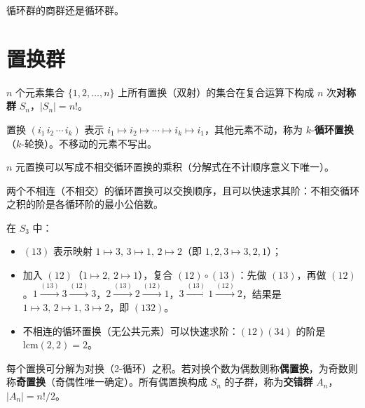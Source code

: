 \begin{proposition}[循环群的商群]
循环群的商群还是循环群。
\end{proposition}

\section{置换群}

\begin{definition}[对称群]
$n$ 个元素集合 $\{1, 2, \ldots, n\}$ 上所有置换（双射）的集合在复合运算下构成 $n$ 次\textbf{对称群} $S_n$，$|S_n| = n!$。
\end{definition}

\begin{definition}[循环置换]
置换 $(i_1\, i_2\, \cdots\, i_k)$ 表示 $i_1 \mapsto i_2 \mapsto \cdots \mapsto i_k \mapsto i_1$，其他元素不动，称为 $k$-\textbf{循环置换}（$k$-轮换）。不移动的元素不写出。
\end{definition}

\begin{theorem}[定理 2：置换分解为循环置换]
$n$ 元置换可以写成不相交循环置换的乘积（分解式在不计顺序意义下唯一）。
\end{theorem}

\begin{note}
两个不相连（不相交）的循环置换可以交换顺序，且可以快速求其阶：不相交循环之积的阶是各循环阶的最小公倍数。
\end{note}

\begin{example}[循环置换的例子]
在 $S_3$ 中：
\begin{itemize}
  \item $(13)$ 表示映射 $1 \mapsto 3,\, 3 \mapsto 1,\, 2 \mapsto 2$（即 $1,2,3 \mapsto 3,2,1$）；
  \item 加入 $(12)$（$1 \mapsto 2,\, 2 \mapsto 1$），复合 $(12) \circ (13)$：先做 $(13)$，再做 $(12)$。$1 \xrightarrow{(13)} 3 \xrightarrow{(12)} 3$，$2 \xrightarrow{(13)} 2 \xrightarrow{(12)} 1$，$3 \xrightarrow{(13)} 1 \xrightarrow{(12)} 2$，结果是 $1 \mapsto 3,\, 2 \mapsto 1,\, 3 \mapsto 2$，即 $(132)$。
  \item 不相连的循环置换（无公共元素）可以快速求阶：$(12)(34)$ 的阶是 $\mathrm{lcm}(2,2) = 2$。
\end{itemize}
\end{example}

\begin{definition}[奇置换与偶置换]
每个置换可分解为对换（2-循环）之积。若对换个数为偶数则称\textbf{偶置换}，为奇数则称\textbf{奇置换}（奇偶性唯一确定）。所有偶置换构成 $S_n$ 的子群，称为\textbf{交错群} $A_n$，$|A_n| = n!/2$。
\end{definition}


